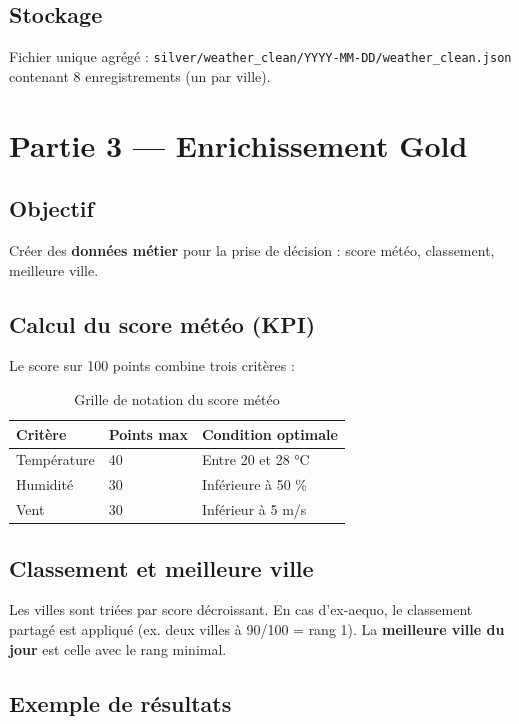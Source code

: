 \documentclass[12pt,a4paper]{report}
\begin{document}
\section{Stockage}

Fichier unique agrégé : \texttt{silver/weather\_clean/YYYY-MM-DD/weather\_clean.json} contenant 8 enregistrements (un par ville).

\chapter{Partie 3 — Enrichissement Gold}

\section{Objectif}

Créer des \textbf{données métier} pour la prise de décision : score météo, classement, meilleure ville.

\section{Calcul du score météo (KPI)}

Le score sur 100 points combine trois critères :

\begin{table}[H]
\centering
\caption{Grille de notation du score météo}
\begin{tabular}{@{}p{4cm}p{2cm}p{7cm}@{}}
\toprule
\textbf{Critère} & \textbf{Points max} & \textbf{Condition optimale} \\
\midrule
Température & 40 & Entre 20 et 28 °C \\
Humidité    & 30 & Inférieure à 50 \% \\
Vent        & 30 & Inférieur à 5 m/s \\
\bottomrule
\end{tabular}
\end{table}

\section{Classement et meilleure ville}

Les villes sont triées par score décroissant. En cas d'ex-aequo, le classement partagé est appliqué (ex. deux villes à 90/100 = rang 1). La \textbf{meilleure ville du jour} est celle avec le rang minimal.

\section{Exemple de résultats}
\end{document}
